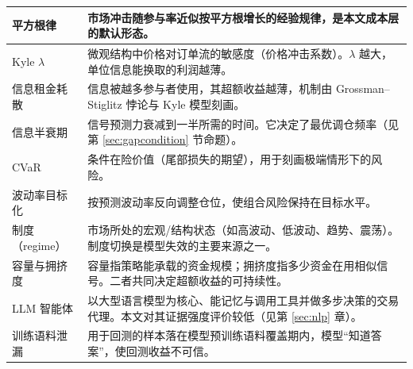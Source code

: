 \begin{longtable}{@{}>{\raggedright\arraybackslash}p{3.6cm}>{\raggedright\arraybackslash}p{11.6cm}@{}}
\midrule
平方根律 & 市场冲击随参与率近似按平方根增长的经验规律，是本文成本层的默认形态。 \\
\midrule
Kyle $\lambda$ & 微观结构中价格对订单流的敏感度（价格冲击系数）。$\lambda$ 越大，单位信息能换取的利润越薄。 \\
\midrule
信息租金耗散 & 信息被越多参与者使用，其超额收益越薄，机制由 Grossman--Stiglitz 悖论与 Kyle 模型刻画。 \\
\midrule
信息半衰期 & 信号预测力衰减到一半所需的时间。它决定了最优调仓频率（见第 \ref{sec:gapcondition} 节命题）。 \\
\midrule
CVaR & 条件在险价值（尾部损失的期望），用于刻画极端情形下的风险。 \\
\midrule
波动率目标化 & 按预测波动率反向调整仓位，使组合风险保持在目标水平。 \\
\midrule
制度（regime） & 市场所处的宏观/结构状态（如高波动、低波动、趋势、震荡）。制度切换是模型失效的主要来源之一。 \\
\midrule
容量与拥挤度 & 容量指策略能承载的资金规模；拥挤度指多少资金在用相似信号。二者共同决定超额收益的可持续性。 \\
\midrule
LLM 智能体 & 以大型语言模型为核心、能记忆与调用工具并做多步决策的交易代理。本文对其证据强度评价较低（见第 \ref{sec:nlp} 章）。 \\
\midrule
训练语料泄漏 & 用于回测的样本落在模型预训练语料覆盖期内，模型“知道答案”，使回测收益不可信。 \\
\bottomrule
\end{longtable}
